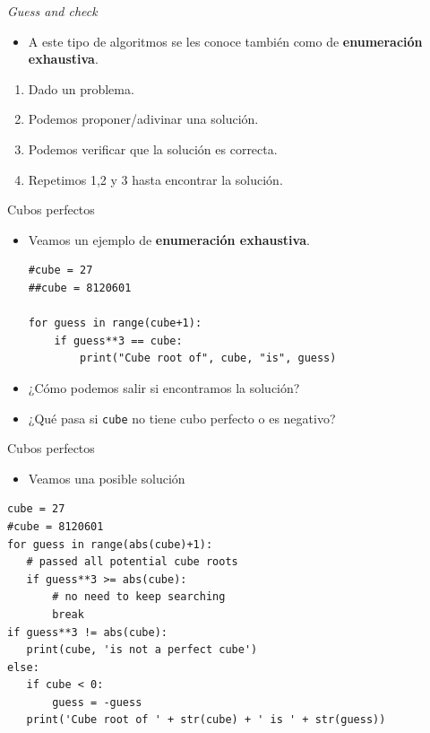 \documentclass[mathserif]{beamer}
\begin{document}
\begin{frame}{\textit{Guess and check}}
    \begin{itemize}
        \item A este tipo de algoritmos se les conoce también como de {\bfseries\blue enumeración exhaustiva}. 
    \end{itemize}
    
    \begin{cpage}
    \begin{enumerate}
        \item Dado un problema.
        \item Podemos {\blue proponer/adivinar} una solución.
        \item Podemos {\blue verificar} que la solución es correcta.
        \item Repetimos 1,2 y 3 hasta encontrar la solución.
    \end{enumerate}
    \end{cpage}
\end{frame}

\begin{frame}[fragile]{Cubos perfectos}
    \begin{itemize}
        \item Veamos un ejemplo de {\bfseries\blue enumeración exhaustiva}.
        
\begin{lstlisting}
#cube = 27
##cube = 8120601

for guess in range(cube+1):
    if guess**3 == cube:
        print("Cube root of", cube, "is", guess)
\end{lstlisting}

        \item ¿Cómo podemos salir si encontramos la solución?
        \item ¿Qué pasa si \lstinline|cube| no tiene cubo perfecto o es negativo?
    \end{itemize}
\end{frame}

\begin{frame}[fragile]{Cubos perfectos}
    \begin{itemize}
        \item Veamos una posible solución
    \end{itemize}
\begin{lstlisting}
cube = 27
#cube = 8120601
for guess in range(abs(cube)+1):
   # passed all potential cube roots
   if guess**3 >= abs(cube):
       # no need to keep searching
       break
if guess**3 != abs(cube):
   print(cube, 'is not a perfect cube')
else:
   if cube < 0:
       guess = -guess
   print('Cube root of ' + str(cube) + ' is ' + str(guess))
\end{lstlisting}
\end{frame}
\end{document}
